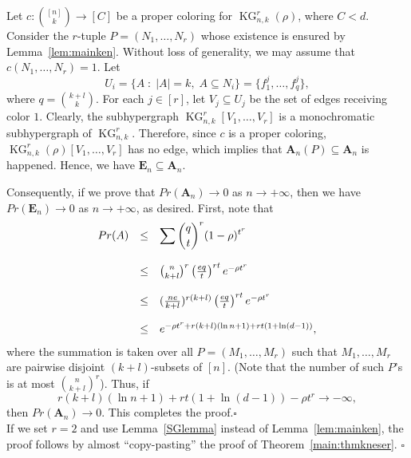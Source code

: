\documentclass[11pt]{amsart}
\theoremstyle{definition}
\theoremstyle{remark}
\def\ds{\displaystyle}
\def\KG{\operatorname{KG}}
\begin{document}
Let $c:{[n]\choose k}\longrightarrow [C]$ be a proper coloring for $\KG^r_{n,k}(\rho)$,
where $C<d.$ 
Consider the $r$-tuple  $P=(N_1,\ldots,N_r)$ whose existence is 
ensured by Lemma~\ref{lem:mainken}. Without loss of generality, we may assume that 
$c(N_1,\ldots,N_r)=1$. Let $$U_i=\{A\;:\; |A|=k,\; A\subseteq N_i\}=\{f_1^j,\ldots,f_q^j\},$$
where $q={k+l\choose k}$. 
For each $j\in[r]$, let 
$V_{j}\subseteq U_j$ be the set of edges receiving color $1$.  
Clearly,  the subhypergraph 
$\KG^r_{n,k}[V_1,\ldots,V_r]$ is a monochromatic subhypergraph of 
$\KG^r_{n,k}$. Therefore, since $c$ is a proper coloring,  $\KG^r_{n,k}(\rho)[V_1,\ldots,V_r]$  has no edge, which implies that $\mathbf{A}_n(P)\subseteq \mathbf{A}_n$ is happened. Hence, we have $\mathbf{E}_n\subseteq \mathbf{A}_n$.
 
Consequently, if we prove that $Pr(\mathbf{A}_n)\rightarrow 0$  as $n\rightarrow +\infty$, then we have
$Pr(\mathbf{E}_n)\rightarrow 0$ as $n\rightarrow +\infty$, as desired. 
First, note that  
$$\begin{array}{lll}
Pr(A) &\leq & \ds\sum {q\choose t}^r(1-\rho)^{t^r}\\ \\
	 & \leq & {n\choose k+l}^r\left({eq\over t}\right)^{rt}e^{-\rho t^r}\\ \\
	 & \leq & ({ne\over k+l})^{r(k+l)}\left({eq\over t}\right)^{rt}e^{-\rho t^r}\\ \\
	 & \leq & e^{-\rho t^r+r(k+l)(\ln n+1) +rt(1+\ln (d-1))},
\end{array}$$ 
where the summation is taken over all $P=(M_1,\ldots,M_r)$ such that $M_1,\ldots,M_r$ are pairwise disjoint $(k+l)$-subsets of $[n]$. (Note that the number 
of such $P$'s is at most ${n\choose k+l}^r$).
Thus, if 
$$r(k+l)(\ln n+1) +rt(1+\ln (d-1))-\rho t^r\rightarrow -\infty,$$
then $Pr(\mathbf{A}_n)\rightarrow 0$. This completes the proof.\hfill$\square$
\\

If we set $r=2$ and use Lemma~\ref{SGlemma} instead of Lemma~\ref{lem:mainken}, the proof follows by almost ``copy-pasting'' the proof of Theorem~\ref{main:thmkneser}.
\hfill$\square$\\
\end{document}

